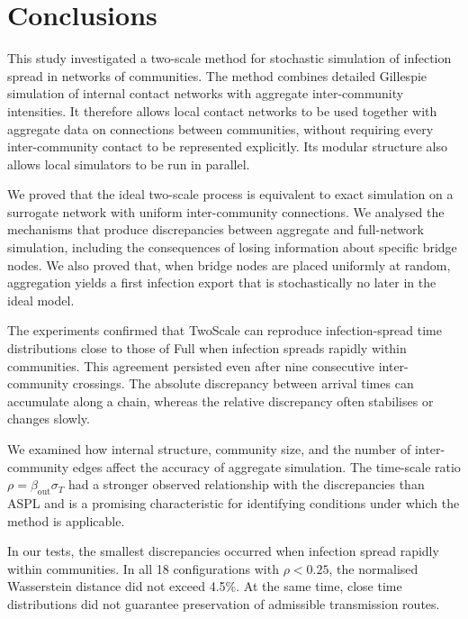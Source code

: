 \documentclass{ieeeaccess}
\newcommand{\Full}{\textup{Full}}
\newcommand{\TS}{\textup{TwoScale}}
\begin{document}
\section{Conclusions}
\label{sec:conclusions}

This study investigated a two-scale method for stochastic simulation of infection spread in networks of communities. The method combines detailed Gillespie simulation of internal contact networks with aggregate inter-community intensities. It therefore allows local contact networks to be used together with aggregate data on connections between communities, without requiring every inter-community contact to be represented explicitly. Its modular structure also allows local simulators to be run in parallel.

We proved that the ideal two-scale process is equivalent to exact simulation on a surrogate network with uniform inter-community connections. We analysed the mechanisms that produce discrepancies between aggregate and full-network simulation, including the consequences of losing information about specific bridge nodes. We also proved that, when bridge nodes are placed uniformly at random, aggregation yields a first infection export that is stochastically no later in the ideal model.

The experiments confirmed that \TS{} can reproduce infection-spread time distributions close to those of \Full{} when infection spreads rapidly within communities. This agreement persisted even after nine consecutive inter-community crossings. The absolute discrepancy between arrival times can accumulate along a chain, whereas the relative discrepancy often stabilises or changes slowly.

We examined how internal structure, community size, and the number of inter-community edges affect the accuracy of aggregate simulation. The time-scale ratio $\rho=\beta_{\mathrm{out}}\sigma_T$ had a stronger observed relationship with the discrepancies than ASPL and is a promising characteristic for identifying conditions under which the method is applicable.

In our tests, the smallest discrepancies occurred when infection spread rapidly within communities. In all 18 configurations with $\rho<0.25$, the normalised Wasserstein distance did not exceed 4.5\%. At the same time, close time distributions did not guarantee preservation of admissible transmission routes.


\end{document}
